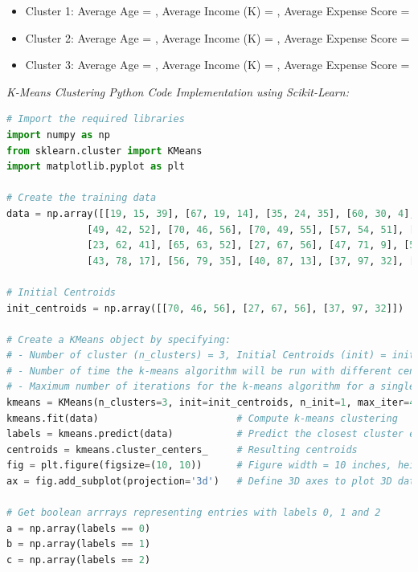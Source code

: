 \documentclass{book}
\begin{document}
\begin{itemize}
    \item Cluster 1: Average Age = , Average Income (K) = , Average Expense Score = 
    \item Cluster 2: Average Age = , Average Income (K) = , Average Expense Score = 
    \item Cluster 3: Average Age = , Average Income (K) = , Average Expense Score = 
\end{itemize}
\newpage
\textit{\large{K-Means Clustering Python Code Implementation using Scikit-Learn:}}\\
\begin{lstlisting}[language=Python, basicstyle=\ttfamily\small, keywordstyle=\color{blue}, commentstyle=\color{forestgreen}, stringstyle=\color{red}, showstringspaces=false]
# Import the required libraries
import numpy as np
from sklearn.cluster import KMeans
import matplotlib.pyplot as plt

# Create the training data
data = np.array([[19, 15, 39], [67, 19, 14], [35, 24, 35], [60, 30, 4], [65, 38, 35]
              [49, 42, 52], [70, 46, 56], [70, 49, 55], [57, 54, 51], [68, 59, 55]
              [23, 62, 41], [65, 63, 52], [27, 67, 56], [47, 71, 9], [57, 75, 5]
              [43, 78, 17], [56, 79, 35], [40, 87, 13], [37, 97, 32], [34, 103, 23]])

# Initial Centroids
init_centroids = np.array([[70, 46, 56], [27, 67, 56], [37, 97, 32]])

# Create a KMeans object by specifying:
# - Number of cluster (n_clusters) = 3, Initial Centroids (init) = init_centroids
# - Number of time the k-means algorithm will be run with different centroid seeds (n_init) = 1
# - Maximum number of iterations for the k-means algorithm for a single run (max_iter) = 4
kmeans = KMeans(n_clusters=3, init=init_centroids, n_init=1, max_iter=4)
kmeans.fit(data)                        # Compute k-means clustering
labels = kmeans.predict(data)           # Predict the closest cluster each sample in data belongs to
centroids = kmeans.cluster_centers_     # Resulting centroids
fig = plt.figure(figsize=(10, 10))      # Figure width = 10 inches, height = 10 inches
ax = fig.add_subplot(projection='3d')   # Define 3D axes to plot 3D data into it

# Get boolean arrrays representing entries with labels 0, 1 and 2
a = np.array(labels == 0)
b = np.array(labels == 1)
c = np.array(labels == 2)


\end{lstlisting}
\end{document}

